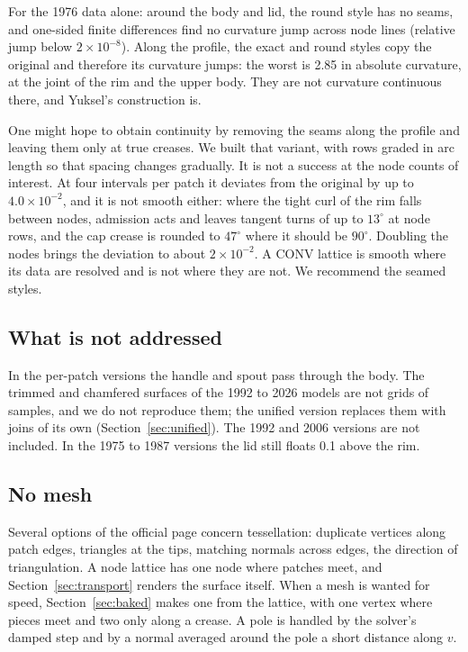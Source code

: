 \documentclass[journal]{IEEEtran}
\begin{document}
For the 1976 data alone: around the body
and lid, the round style has no seams, and one-sided finite differences
find no curvature jump across node lines (relative jump below
$2\times10^{-8}$). Along the profile, the exact and round styles copy the
original and therefore its curvature jumps: the worst is 2.85 in absolute
curvature, at the joint of the rim and the upper body. They are not
curvature continuous there, and Yuksel's construction \cite{yuksel2026}
is.

One might hope to obtain continuity by removing the seams along the
profile and leaving them only at true creases. We built that variant,
with rows graded in arc length so that spacing changes gradually. It is
not a success at the node counts of interest. At four intervals per patch
it deviates from the original by up to $4.0\times10^{-2}$, and it is not
smooth either: where the tight curl of the rim falls between nodes,
admission acts and leaves tangent turns of up to $13^\circ$ at node
rows, and the cap crease is rounded to $47^\circ$ where it should be
$90^\circ$. Doubling the nodes brings the deviation to about
$2\times10^{-2}$. A CONV lattice is smooth where its data are resolved
and is not where they are not. We recommend the seamed styles.

\subsection{What is not addressed}

In the per-patch versions the handle and spout pass through the body. The
trimmed and chamfered surfaces of the 1992 to 2026 models are not grids
of samples, and we do not reproduce them; the unified version replaces
them with joins of its own (Section~\ref{sec:unified}). The 1992 and 2006
versions are not included. In the 1975 to 1987 versions the lid still
floats 0.1 above the rim.

\subsection{No mesh}

Several options of the official page concern tessellation: duplicate
vertices along patch edges, triangles at the tips, matching normals
across edges, the direction of triangulation. A node lattice has one node
where patches meet, and Section~\ref{sec:transport} renders the surface
itself. When a mesh is wanted for speed, Section~\ref{sec:baked} makes
one from the lattice, with one vertex where pieces meet and two only
along a crease. A pole is handled by the solver's damped step and by a normal averaged
around the pole a short distance along $v$.
\end{document}
